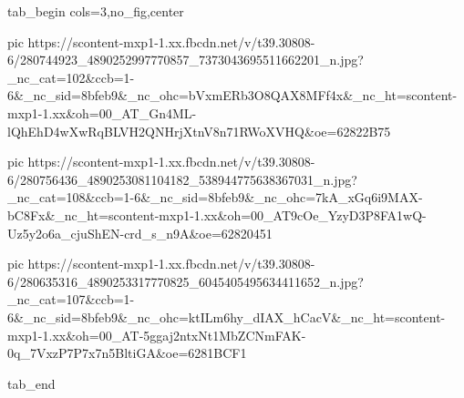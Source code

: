  
 
 
 
 


\ifcmt
  tab_begin cols=3,no_fig,center

     pic https://scontent-mxp1-1.xx.fbcdn.net/v/t39.30808-6/280744923_4890252997770857_7373043695511662201_n.jpg?_nc_cat=102&ccb=1-6&_nc_sid=8bfeb9&_nc_ohc=bVxmERb3O8QAX8MFf4x&_nc_ht=scontent-mxp1-1.xx&oh=00_AT_Gn4ML-lQhEhD4wXwRqBLVH2QNHrjXtnV8n71RWoXVHQ&oe=62822B75

     pic https://scontent-mxp1-1.xx.fbcdn.net/v/t39.30808-6/280756436_4890253081104182_538944775638367031_n.jpg?_nc_cat=108&ccb=1-6&_nc_sid=8bfeb9&_nc_ohc=7kA_xGq6i9MAX-bC8Fx&_nc_ht=scontent-mxp1-1.xx&oh=00_AT9cOe_YzyD3P8FA1wQ-Uz5y2o6a_cjuShEN-crd_s_n9A&oe=62820451

     pic https://scontent-mxp1-1.xx.fbcdn.net/v/t39.30808-6/280635316_4890253317770825_6045405495634411652_n.jpg?_nc_cat=107&ccb=1-6&_nc_sid=8bfeb9&_nc_ohc=ktILm6hy_dIAX_hCacV&_nc_ht=scontent-mxp1-1.xx&oh=00_AT-5ggaj2ntxNt1MbZCNmFAK-0q_7VxzP7P7x7n5BltiGA&oe=6281BCF1

  tab_end
\fi
